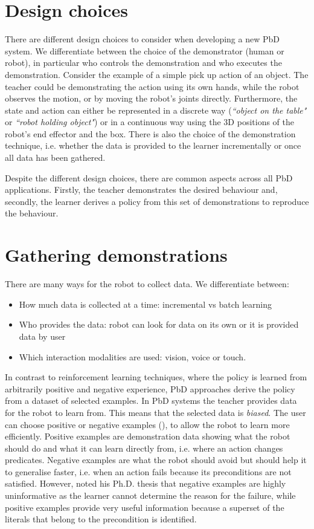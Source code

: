\section{Design choices}\label{subsec:Design choices}
There are different design choices to consider when developing a new PbD system.
We differentiate between the choice of the demonstrator (human or robot), in particular who controls the demonstration and who executes the demonstration.
 Consider the example of a simple pick up action of an object.
 The teacher could be demonstrating the action using its own hands, while the robot observes the motion, or by moving the robot's joints directly.
 Furthermore, the state and action can either be represented in a discrete way (\textit{``object on the table"} or \textit{``robot holding object"}) or in a continuous way using the 3D positions of the robot's end effector and the box.
 There is also the choice of the demonstration technique, i.e. whether the data is provided to the learner incrementally or once all data has been gathered.
 
Despite the different design choices, there are common aspects across all PbD applications. Firstly, the teacher demonstrates the desired behaviour and, secondly, the learner derives a policy from this set of demonstrations to reproduce the behaviour.

\section{Gathering demonstrations} \label{subsec:Gathering demonstrations}
There are many ways for the robot to collect data.
 We differentiate between:
\begin{itemize}
    \item How much data is collected at a time: incremental vs batch learning
    \item Who provides the data: robot can look for data on its own or it is provided data by user
    \item Which interaction modalities are used: vision, voice or touch. 
\end{itemize}

In contrast to reinforcement learning techniques, where the policy is learned from arbitrarily positive and negative experience, PbD approaches derive the policy from a dataset of selected examples.
In PbD systems the teacher provides data for the robot to learn from.
This means that the selected data is \textit{biased}. 
The user can choose positive or negative examples (\cite{grollman2012robot}), to allow the robot to learn more efficiently.
Positive examples are demonstration data showing what the robot should do and what it can learn directly from, i.e. where an action changes predicates.
Negative examples are what the robot should avoid but should help it to generalise faster, i.e. when an action fails because its preconditions are not satisfied.
However, \cite{walsh2010efficient} noted his Ph.D. thesis that negative examples are highly uninformative as the learner cannot determine the reason for the failure, while positive examples provide very useful information because a superset of the literals that belong to the precondition is identified.

